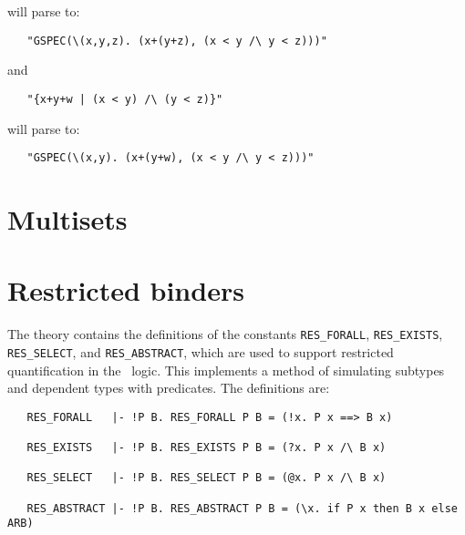 \noindent will parse to:

\begin{hol}\begin{verbatim}
   "GSPEC(\(x,y,z). (x+(y+z), (x < y /\ y < z)))"
\end{verbatim}\end{hol}

\noindent and

\begin{hol}\begin{verbatim}
   "{x+y+w | (x < y) /\ (y < z)}"
\end{verbatim}\end{hol}

\noindent will parse to:

\begin{hol}\begin{verbatim}
   "GSPEC(\(x,y). (x+(y+w), (x < y /\ y < z)))"
\end{verbatim}\end{hol}

\section{Multisets}

\section{Restricted binders}\label{res-quant}


The theory  contains the definitions of the constants
{\small\verb!RES_FORALL!}, {\small\verb!RES_EXISTS!},
{\small\verb!RES_SELECT!}, and {\small\verb!RES_ABSTRACT!},
which are used to support restricted
quantification in the \HOL\ logic.  This
implements a method of simulating subtypes and dependent types with
predicates. The definitions are:

\begin{hol}
\begin{verbatim}
   RES_FORALL   |- !P B. RES_FORALL P B = (!x. P x ==> B x)

   RES_EXISTS   |- !P B. RES_EXISTS P B = (?x. P x /\ B x)

   RES_SELECT   |- !P B. RES_SELECT P B = (@x. P x /\ B x)

   RES_ABSTRACT |- !P B. RES_ABSTRACT P B = (\x. if P x then B x else ARB)
\end{verbatim}\end{hol}


